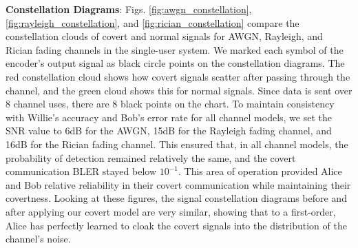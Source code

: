 \textbf{Constellation Diagrams}: Figs. \ref{fig:awgn_constellation}, \ref{fig:rayleigh_constellation}, and \ref{fig:rician_constellation} compare the constellation clouds of covert and normal signals for AWGN, Rayleigh, and Rician fading channels in the single-user system. We marked each symbol of the encoder's output signal as black circle points on the constellation diagrams. The red constellation cloud shows how covert signals scatter after passing through the channel, and the green cloud shows this for normal signals. Since data is sent over 8 channel uses, there are 8 black points on the chart. To maintain consistency with Willie's accuracy and Bob's error rate for all channel models, we set the SNR value to 6dB for the AWGN, 15dB for the Rayleigh fading channel, and 16dB for the Rician fading channel. This ensured that, in all channel models, the probability of detection remained relatively the same, and the covert communication BLER stayed below \(10^{-1}\). This area of operation provided Alice and Bob relative reliability in their covert communication while maintaining their covertness.
Looking at these figures, the signal constellation diagrams before and after applying our covert model are very similar, showing that to a first-order, Alice has perfectly learned to cloak the covert signals into the distribution of the channel's noise.